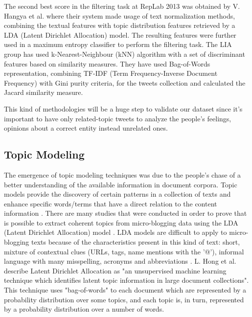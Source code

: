 The second best score in the filtering task at RepLab 2013 was obtained by V. Hangya et al. \cite{kn:hangya2013} where their system made usage of text normalization methods, combining the textual features with topic distribution features retrieved by a LDA (Latent Dirichlet Allocation) model. The resulting features were further used in a maximum entropy classifier to perform the filtering task. The LIA \cite{kn:Cossu2013} group has used k-Nearest-Neighbour (kNN) algorithm with a set of discriminant features based on similarity measures. They have used Bag-of-Words representation, combining TF-IDF (Term Frequency-Inverse Document Frequency) with Gini purity criteria, for the tweets collection and calculated the Jacard similarity measure.

This kind of methodologies will be a huge step to validate our dataset since it's important to have only related-topic tweets to analyze the people's feelings, opinions about a correct entity instead unrelated ones.

\subsection{Topic Modeling} \label{subsec:topicmodeling}
The emergence of topic modeling techniques was due to the people's chase of a better understanding of the available information in document corpora. Topic models provide the discovery of certain patterns in a collection of texts and enhance specific words/terms that have a direct relation to the content information \cite{kn:Mehrotra2013}. There are many studies that were conducted in order to prove that is possible to extract coherent topics from micro-blogging data using the LDA (Latent Dirichlet Allocation) model \cite{kn:Mehrotra2013, kn:Hong2010, kn:Zhao2011}. LDA models are difficult to apply to micro-blogging texts because of the characteristics present in this kind of text: short, mixture of contextual clues (URLs, tags, name mentions with the '@'), informal language with many misspelling, acronyms and abbreviations \cite{kn:Mehrotra2013}. L. Hong et al. \cite{kn:Hong2010} describe Latent Dirichlet Allocation as "an unsupervised machine learning technique which identifies latent topic information in large document collections". This technique uses "bag-of-words" to each document which  are represented by a probability distribution over some topics, and each topic is, in turn, represented by a probability distribution over a number of words.

